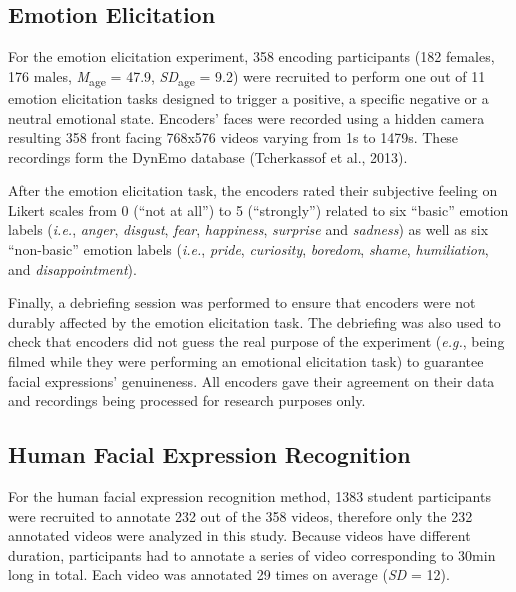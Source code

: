 \documentclass[
  english,
  doc]{apa7}
\begin{document}
\hypertarget{emotion-elicitation}{%
\subsection{Emotion Elicitation}\label{emotion-elicitation}}

For the emotion elicitation experiment, 358 encoding participants (182 females, 176 males, \emph{M}\textsubscript{age} = 47.9, \emph{SD}\textsubscript{age} = 9.2) were recruited to perform one out of 11 emotion elicitation tasks designed to trigger a positive, a specific negative or a neutral emotional state. Encoders' faces were recorded using a hidden camera resulting 358 front facing 768x576 videos varying from 1s to 1479s. These recordings form the DynEmo database (Tcherkassof et al., 2013).

After the emotion elicitation task, the encoders rated their subjective feeling on Likert scales from 0 (``not at all'') to 5 (``strongly'') related to six ``basic'' emotion labels (\emph{i.e.}, \emph{anger}, \emph{disgust}, \emph{fear}, \emph{happiness}, \emph{surprise} and \emph{sadness}) as well as six ``non-basic'' emotion labels (\emph{i.e.}, \emph{pride}, \emph{curiosity}, \emph{boredom}, \emph{shame}, \emph{humiliation}, and \emph{disappointment}).

Finally, a debriefing session was performed to ensure that encoders were not durably affected by the emotion elicitation task. The debriefing was also used to check that encoders did not guess the real purpose of the experiment (\emph{e.g.}, being filmed while they were performing an emotional elicitation task) to guarantee facial expressions' genuineness. All encoders gave their agreement on their data and recordings being processed for research purposes only.

\hypertarget{human-facial-expression-recognition}{%
\subsection{Human Facial Expression Recognition}\label{human-facial-expression-recognition}}

For the human facial expression recognition method, 1383 student participants were recruited to annotate 232 out of the 358 videos, therefore only the 232 annotated videos were analyzed in this study. Because videos have different duration, participants had to annotate a series of video corresponding to 30min long in total. Each video was annotated 29 times on average (\emph{SD} = 12).
\end{document}
